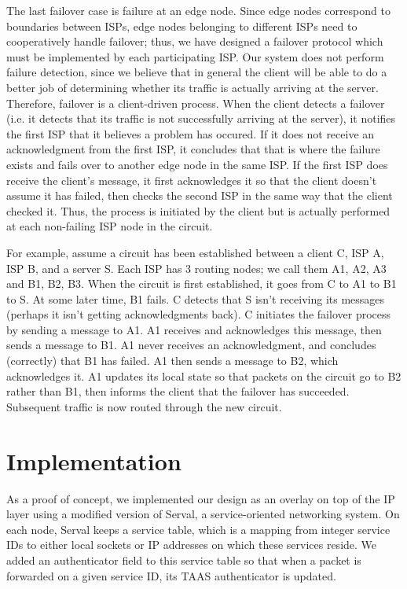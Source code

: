 \documentclass{article}
\begin{document}
The last failover case is failure at an edge node. Since edge nodes
correspond to boundaries between ISPs, edge nodes belonging to
different ISPs need to cooperatively handle failover; thus, we have
designed a failover protocol which must be implemented by each
participating ISP.  Our system does not perform failure detection,
since we believe that in general the client will be able to do a
better job of determining whether its traffic is actually arriving at
the server. Therefore, failover is a client-driven process. When the
client detects a failover (i.e. it detects that its traffic is not
successfully arriving at the server), it notifies the first ISP that
it believes a problem has occured. If it does not receive an
acknowledgment from the first ISP, it concludes that that is where the
failure exists and fails over to another edge node in the same ISP. If
the first ISP does receive the client's message, it first acknowledges
it so that the client doesn't assume it has failed, then checks the
second ISP in the same way that the client checked it. Thus, the
process is initiated by the client but is actually performed at each
non-failing ISP node in the circuit.

For example, assume a circuit has been established between a client C,
ISP A, ISP B, and a server S. Each ISP has 3 routing nodes; we call
them A1, A2, A3 and B1, B2, B3. When the circuit is first established,
it goes from C to A1 to B1 to S. At some later time, B1 fails. C
detects that S isn't receiving its messages (perhaps it isn't getting
acknowledgments back). C initiates the failover process by sending a
message to A1. A1 receives and acknowledges this message, then sends a
message to B1. A1 never receives an acknowledgment, and concludes
(correctly) that B1 has failed. A1 then sends a message to B2, which
acknowledges it. A1 updates its local state so that packets on the
circuit go to B2 rather than B1, then informs the client that the
failover has succeeded. Subsequent traffic is now routed through the
new circuit.

\section{Implementation}
As a proof of concept, we implemented our design as an overlay on top
of the IP layer using a modified version of Serval, a service-oriented
networking system. On each node, Serval keeps a service table, which
is a mapping from integer service IDs to either local sockets or IP
addresses on which these services reside. We added an authenticator
field to this service table so that when a packet is forwarded on a
given service ID, its TAAS authenticator is updated.
\end{document}
